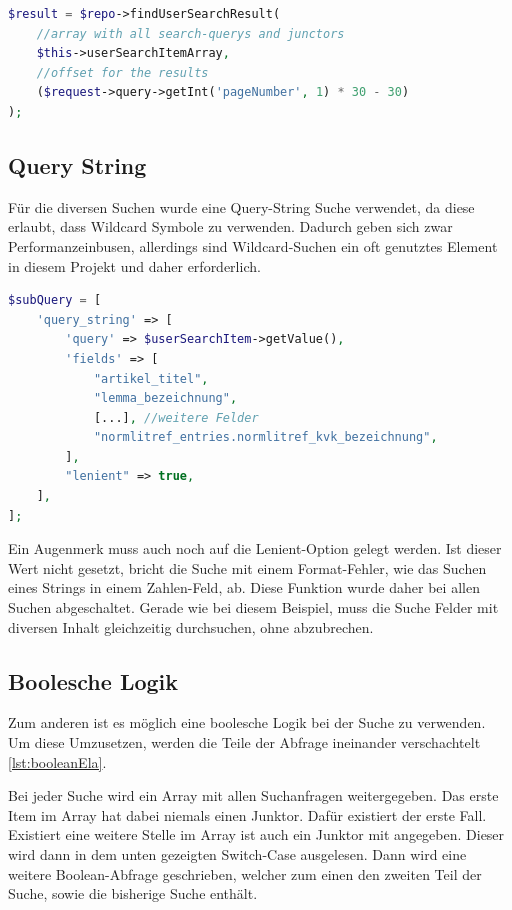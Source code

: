 \begin{lstlisting}[language=PHP, frame=single, label={lst:generierung}] 
$result = $repo->findUserSearchResult(
    //array with all search-querys and junctors
    $this->userSearchItemArray, 
    //offset for the results
    ($request->query->getInt('pageNumber', 1) * 30 - 30)
);
\end{lstlisting}

\subsection{Query String}
Für die diversen Suchen wurde eine Query-String Suche verwendet, da diese erlaubt, dass Wildcard Symbole zu verwenden. Dadurch geben sich zwar Performanzeinbusen, allerdings sind Wildcard-Suchen ein oft genutztes Element in diesem Projekt und daher erforderlich.

\begin{lstlisting}[language=PHP, frame=single, label={lst:aufbauQueryString}] 
$subQuery = [
    'query_string' => [
        'query' => $userSearchItem->getValue(),
        'fields' => [
            "artikel_titel",
            "lemma_bezeichnung",
            [...], //weitere Felder
            "normlitref_entries.normlitref_kvk_bezeichnung",
        ],
        "lenient" => true,
    ],
];
\end{lstlisting}

Ein Augenmerk muss auch noch auf die Lenient-Option gelegt werden. Ist dieser Wert nicht gesetzt, bricht die Suche mit einem Format-Fehler, wie das Suchen eines Strings in einem Zahlen-Feld, ab. Diese Funktion wurde daher bei allen Suchen abgeschaltet. Gerade wie bei diesem Beispiel, muss die Suche Felder mit diversen Inhalt gleichzeitig durchsuchen, ohne abzubrechen. 

\subsection{Boolesche Logik}

Zum anderen ist es möglich eine boolesche Logik bei der Suche zu verwenden. Um diese Umzusetzen, werden die Teile der Abfrage ineinander verschachtelt \ref{lst:booleanEla}. 

Bei jeder Suche wird ein Array mit allen Suchanfragen weitergegeben. Das erste Item im Array hat dabei niemals einen Junktor. Dafür existiert der erste Fall. Existiert eine weitere Stelle im Array ist auch ein Junktor mit angegeben. Dieser wird dann in dem unten gezeigten Switch-Case ausgelesen. Dann wird eine weitere Boolean-Abfrage geschrieben, welcher zum einen den zweiten Teil der Suche, sowie die bisherige Suche enthält.

